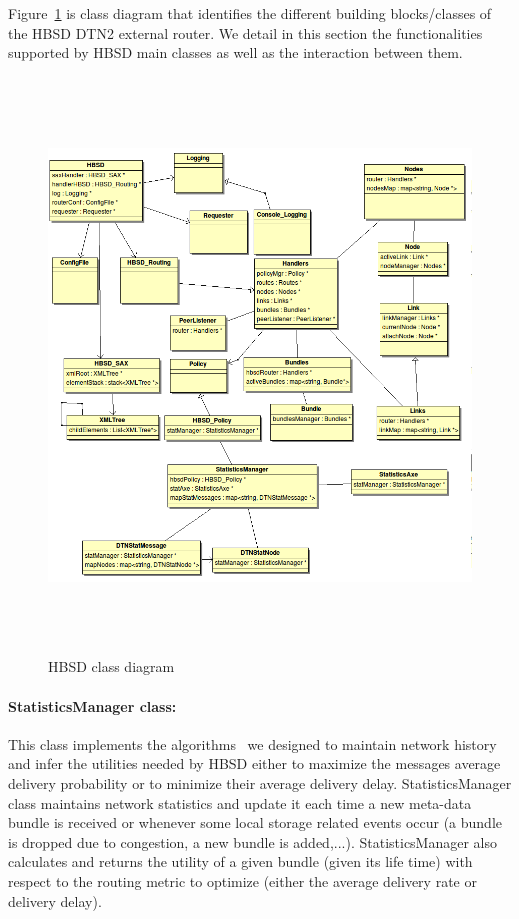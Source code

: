 Figure~\ref{HBSD-CLASS} is class diagram that identifies the different building blocks/classes of the HBSD DTN2 external router. We detail in this section the functionalities supported by HBSD main classes as well as the interaction between them.

\begin{figure}[!h]
\centering
\includegraphics[width=6in,height=6in]{Chapitre4/HBSDClasses.png}
\caption{HBSD class diagram}
\label{HBSD-CLASS}
\end{figure}

\paragraph{StatisticsManager class:}

This class implements the algorithms~\cite{TMC:Report} we designed to maintain network history and infer the utilities needed by HBSD either to maximize the messages average delivery probability  or to minimize their average delivery delay.  
StatisticsManager class maintains network statistics and update it each time a new meta-data
bundle is received or whenever some local storage related events occur (a bundle is dropped due
to congestion, a new bundle is added,...).
StatisticsManager also calculates and returns the utility of a given bundle (given its life time)
with respect to the routing metric to optimize (either the average delivery rate or delivery
delay).


